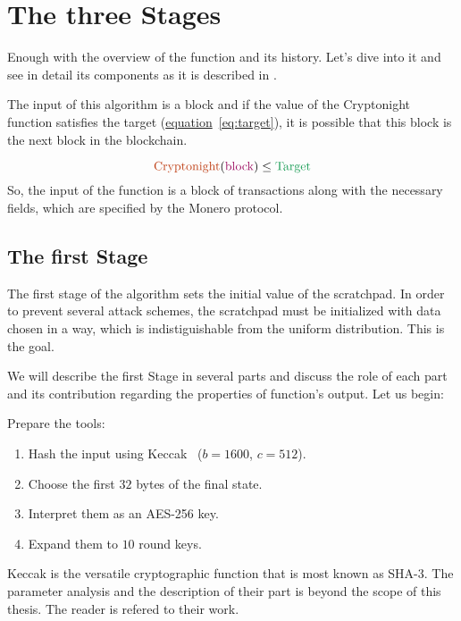 \section{The three Stages}
Enough with the overview of the function and its history. Let's dive into it and see in detail its components as it is described in \cite{cryptonight}.

The input of this algorithm is a block and if the value of the Cryptonight function satisfies the target (\hyperref[eq:target]{equation}~\ref{eq:target}), it is possible that this block is the next block in the blockchain.

\begin{equation}
  \label{eq:target}
  \color{Bittersweet} \mbox{Cryptonight}
  \color{black} (
  \color{RedViolet} \mbox{block}
  \color{black} )\leq
  \color{ForestGreen} \mbox{Target}
  \color{black}
\end{equation}
So, the input of the function is a block of transactions along with the necessary fields, which are specified by the Monero protocol.

\subsection{The first Stage}
The first stage of the algorithm sets the initial value of the scratchpad. In order to prevent several attack schemes, the scratchpad must be initialized with data chosen in a way, which is indistiguishable from the uniform distribution. This is the goal.

We will describe the first Stage in several parts and discuss the role of each part and its contribution regarding the properties of function's output. Let us begin:

\noindent Prepare the tools:
\begin{enumerate}
  \item \label{hashing} Hash the input using Keccak~\cite{keccak} ($b=1600$, $c=512$).
  \item Choose the first $32$ bytes of the final state.
  \item Interpret them as an AES-256 key.
  \item Expand them to $10$ round keys.
\end{enumerate}
Keccak is the versatile cryptographic function that is most known as SHA-3. The parameter analysis and the description of their part is beyond the scope of this thesis. The reader is refered to their work.

